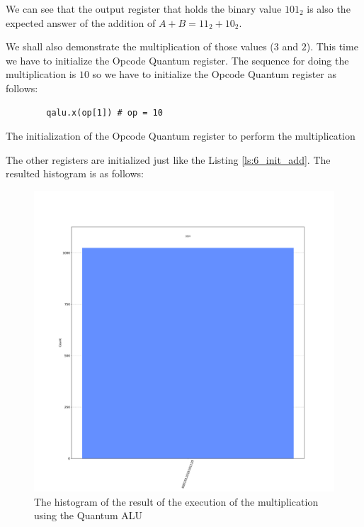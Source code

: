 We can see that the output register that holds the binary value $101_2$ is also the expected answer of the addition of $A+B=11_2+10_2$.

We shall also demonstrate the multiplication of those values ($3$ and $2$). This time we have to initialize the Opcode Quantum register.
The sequence for doing the multiplication is $10$ so we have to initialize the Opcode Quantum register as follows:

\begin{listing}[ht]
    \centering
    \begin{verbatim}
        qalu.x(op[1]) # op = 10
    \end{verbatim}
    \caption{The initialization of the Opcode Quantum register to perform the multiplication}
\end{listing}

The other registers are initialized just like the Listing \ref{ls:6_init_add}. The resulted histogram is as follows:

\begin{figure}[ht]
    \centering
    \includegraphics[scale=0.2]{images/6_Complete_System/qalu_aer_result_multiplication.pdf}
    \caption{The histogram of the result of the execution of the multiplication using the Quantum ALU}
\end{figure}

